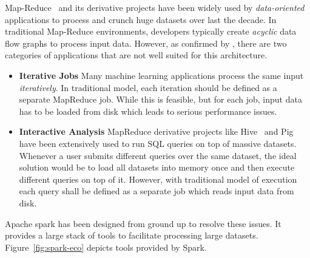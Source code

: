 Map-Reduce~\cite{Dean:2004} and its derivative projects have been widely used by \emph{data-oriented} applications to process and crunch huge datasets over last the decade. In traditional Map-Reduce environments, developers typically create \emph{acyclic} data flow graphs to process input data. However, as confirmed by \textcite{Zaharia:2010}, there are two categories of applications that are not well suited for this architecture.
\begin{itemize}
    \item \textbf{Iterative Jobs} Many machine learning applications process the same input \emph{iteratively}. In traditional model, each iteration should be defined as a separate MapReduce job. While this is feasible, but for each job, input data has to be loaded from disk which leads to serious performance issues.
    \item \textbf{Interactive Analysis} MapReduce derivative projects like Hive~\cite{hive} and Pig~\cite{pig} have been extensively used to run SQL queries on top of massive datasets. Whenever a user submits different queries over the same dataset, the ideal solution would be to load all datasets into memory once and then execute different queries on top of it. However, with traditional model of execution each query shall be defined as a separate job which reads input data from disk.
\end{itemize}
Apache spark has been designed from ground up to resolve these issues. It provides a large stack of tools to facilitate processing large datasets. Figure~\ref{fig:spark-eco} depicts tools provided by Spark.
